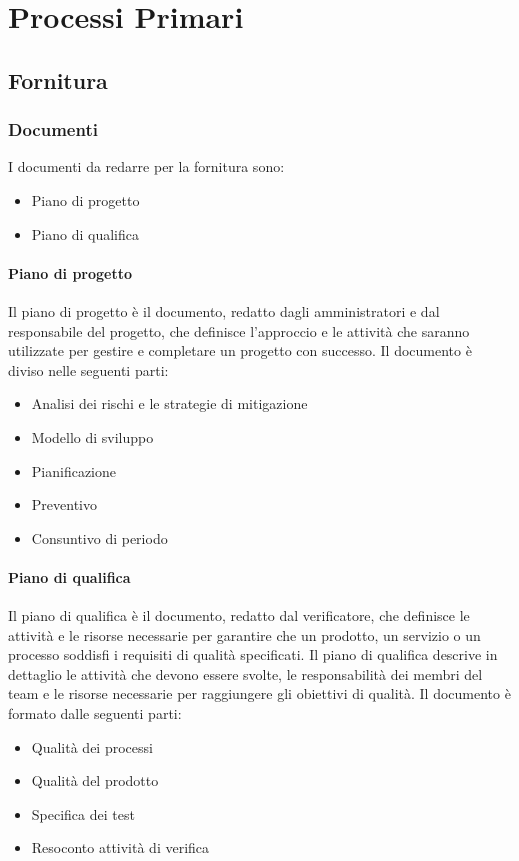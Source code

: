 \documentclass[12pt]{article}
\begin{document}
\section{Processi Primari}
\subsection{Fornitura}
\subsubsection{Documenti}
I documenti da redarre per la fornitura sono:
\begin{itemize}
	\item Piano di progetto
	\item Piano di qualifica
\end{itemize}
\paragraph{Piano di progetto}
Il piano di progetto è il documento, redatto dagli amministratori e dal responsabile del progetto, che definisce l'approccio e le attività che saranno utilizzate per gestire e completare un progetto con successo.
Il documento è diviso nelle seguenti parti:
\begin{itemize}
	\item Analisi dei rischi e le strategie di mitigazione
	\item Modello di sviluppo
	\item Pianificazione
	\item Preventivo
	\item Consuntivo di periodo
\end{itemize}
\paragraph{Piano di qualifica}
Il piano di qualifica è il documento, redatto dal verificatore, che definisce le attività e le risorse necessarie per garantire che un prodotto, un servizio o un processo soddisfi i requisiti di qualità specificati. Il piano di qualifica descrive in dettaglio le attività che devono essere svolte, le responsabilità dei membri del team e le risorse necessarie per raggiungere gli obiettivi di qualità.
Il documento è formato dalle seguenti parti:
\begin{itemize}
	\item  Qualità dei processi
	\item  Qualità del prodotto
	\item  Specifica dei test
	\item 	Resoconto attività di verifica
\end{itemize}
\end{document}
